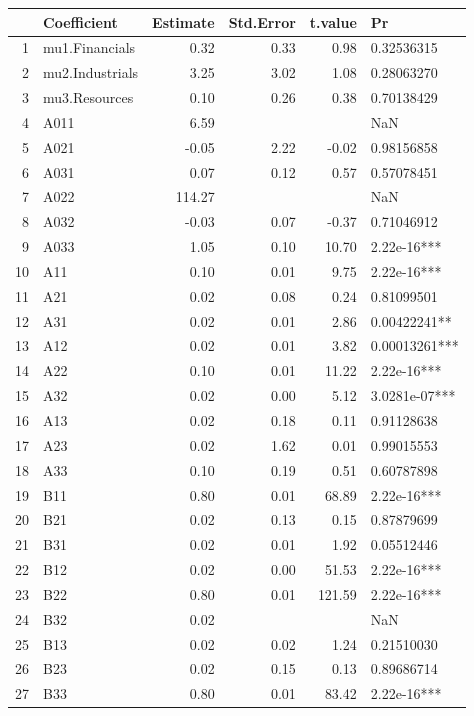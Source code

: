 \documentclass[11pt,preprint, authoryear]{elsarticle}
\let\origtable\table
\let\endorigtable\endtable
\renewenvironment{table}[1][2] {
    \expandafter\origtable\expandafter[H]
} {
    \endorigtable
}
\numberwithin{equation}{section}
\numberwithin{figure}{section}
\numberwithin{table}{section}
\begin{document}
\begin{table}[ht]
\centering
\begin{tabular}{rlrrrl}
  \hline
 & Coefficient & Estimate & Std.Error & t.value & Pr \\ 
  \hline
1 & mu1.Financials & 0.32 & 0.33 & 0.98 & 0.32536315 \\ 
  2 & mu2.Industrials & 3.25 & 3.02 & 1.08 & 0.28063270 \\ 
  3 & mu3.Resources & 0.10 & 0.26 & 0.38 & 0.70138429 \\ 
  4 & A011 & 6.59 &  &  & NaN \\ 
  5 & A021 & -0.05 & 2.22 & -0.02 & 0.98156858 \\ 
  6 & A031 & 0.07 & 0.12 & 0.57 & 0.57078451 \\ 
  7 & A022 & 114.27 &  &  & NaN \\ 
  8 & A032 & -0.03 & 0.07 & -0.37 & 0.71046912 \\ 
  9 & A033 & 1.05 & 0.10 & 10.70 & 2.22e-16*** \\ 
  10 & A11 & 0.10 & 0.01 & 9.75 & 2.22e-16*** \\ 
  11 & A21 & 0.02 & 0.08 & 0.24 & 0.81099501 \\ 
  12 & A31 & 0.02 & 0.01 & 2.86 & 0.00422241** \\ 
  13 & A12 & 0.02 & 0.01 & 3.82 & 0.00013261*** \\ 
  14 & A22 & 0.10 & 0.01 & 11.22 & 2.22e-16*** \\ 
  15 & A32 & 0.02 & 0.00 & 5.12 & 3.0281e-07*** \\ 
  16 & A13 & 0.02 & 0.18 & 0.11 & 0.91128638 \\ 
  17 & A23 & 0.02 & 1.62 & 0.01 & 0.99015553 \\ 
  18 & A33 & 0.10 & 0.19 & 0.51 & 0.60787898 \\ 
  19 & B11 & 0.80 & 0.01 & 68.89 & 2.22e-16*** \\ 
  20 & B21 & 0.02 & 0.13 & 0.15 & 0.87879699 \\ 
  21 & B31 & 0.02 & 0.01 & 1.92 & 0.05512446 \\ 
  22 & B12 & 0.02 & 0.00 & 51.53 & 2.22e-16*** \\ 
  23 & B22 & 0.80 & 0.01 & 121.59 & 2.22e-16*** \\ 
  24 & B32 & 0.02 &  &  & NaN \\ 
  25 & B13 & 0.02 & 0.02 & 1.24 & 0.21510030 \\ 
  26 & B23 & 0.02 & 0.15 & 0.13 & 0.89686714 \\ 
  27 & B33 & 0.80 & 0.01 & 83.42 & 2.22e-16*** \\ 
   \hline
\end{tabular}
\caption{BEKK11 Model} 
\label{tab:bekk11}
\end{table}
\end{document}
